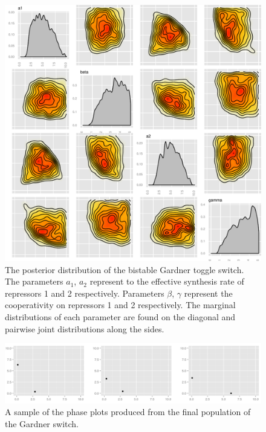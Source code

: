 \cleardoublepage
\begin{figure}[t]
\centering
\includegraphics[scale=0.7]{chapterModelling/images/Gardner/posterior.pdf}
\caption[The posterior distribution of the bistable Gardner toggle switch]{The posterior distribution of the bistable Gardner toggle switch. The parameters $a_1$, $a_2$ represent to the effective synthesis rate of repressors 1 and 2 respectively. Parameters $\beta$, $\gamma$ represent the cooperativity on repressors 1 and 2 respectively. The marginal distributions of each parameter are found on the diagonal and pairwise joint distributions along the sides.}
\label{fig:Gard_post}
\end{figure}


\begin{figure}[t]
\centering
\includegraphics[scale=0.3]{chapterModelling/images/Gardner/phase_plots.png}
\caption{A sample of the phase plots produced from the final population of the Gardner switch.}
\label{fig:det_gard_phase}
\end{figure}

